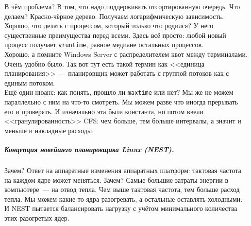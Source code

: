 \documentclass{article}
\begin{document}
    В чём проблема? В том, что надо поддерживать отсортированную очередь. Что делаем? Красно-чёрное дерево. Получаем логарифмическую зависимость.\\
    Хорошо, что делать с процессом, который только что родился? У него существенные преимущества перед всеми. Здесь всё просто: любой новый процесс получает \Verb|vruntime|, равное медиане остальных процессов.\\
    Хорошо, а помните Windows Server с распределителем квот между терминалами. Очень удобно было. Так вот тут есть такой термин как <<единица планирования>>~--- планировщик может работать с группой потоков как с единым потоком.\\
    Ещё один нюанс: как понять, прошло ли \Verb|maxtime| или нет? Мы же не можем параллельно с ним на что-то смотреть. Мы можем разве что иногда прерывать его и проверять. И изначально эта была константа, но потом ввели <<гранулированность>> CFS: чем больше, тем больше интервалы, а значит и меньше и накладные расходы.
    \subparagraph{Концепция новейшего планировщика Linux (NEST).}
    Зачем? Ответ на аппаратные изменения аппаратных платформ: тактовая частота на каждом ядре может меняться. Зачем? Самые большие затраты энергии в компьютере~--- на отвод тепла. Чем выше тактовая частота, тем больше расход тепла. Мы можем какие-то ядра разогревать, а остальные оставлять холодными. И NEST пытается балансировать нагрузку с учётом минимального количества этих разогретых ядер.
\end{document}
